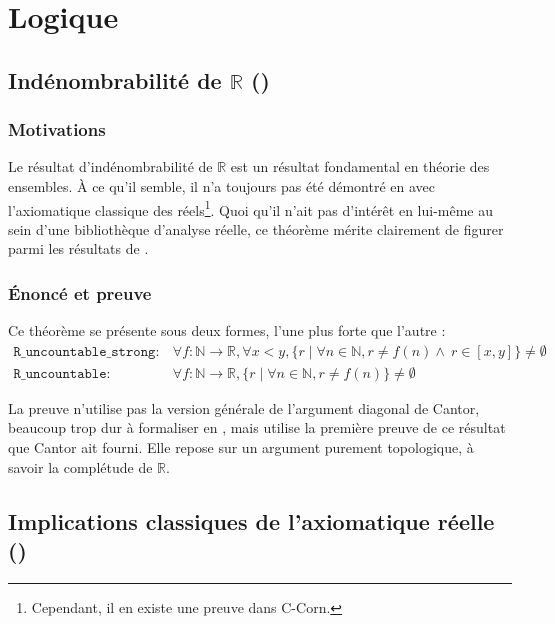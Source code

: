 \section{Logique}

\subsection{Indénombrabilité de $\mathbb{R}$ ()}

\subsubsection{Motivations}

Le résultat d'indénombrabilité de $\mathbb{R}$ est un résultat fondamental en théorie des ensembles. À ce qu'il semble, il n'a toujours pas été démontré en \Coq{} avec l'axiomatique classique des réels\footnote{Cependant, il en existe une preuve dans C-Corn.}. Quoi qu'il n'ait pas d'intérêt en lui-même au sein d'une bibliothèque d'analyse réelle, ce théorème mérite clairement de figurer parmi les résultats de .

\subsubsection{Énoncé et preuve}

Ce théorème se présente sous deux formes, l'une plus forte que l'autre :
$$\begin{array}{ll}
\mathtt{R\_uncountable\_strong} :& \forall f : \mathbb{N}\rightarrow\mathbb{R}, \forall x < y, \{r\mid\forall n\in\mathbb{N}, r \neq f(n) \wedge\ r\in[x, y]\}\neq\emptyset\\
\mathtt{R\_uncountable} :& \forall f : \mathbb{N}\rightarrow\mathbb{R}, \{r\mid\forall n\in\mathbb{N}, r \neq f(n)\}\neq\emptyset
\end{array}$$

La preuve n'utilise pas la version générale de l'argument diagonal de Cantor, beaucoup trop dur à formaliser en \Coq{}, mais utilise la première preuve de ce résultat que Cantor ait fourni. Elle repose sur un argument purement topologique, à savoir la complétude de $\mathbb{R}$.

\subsection{Implications classiques de l'axiomatique réelle ()}


